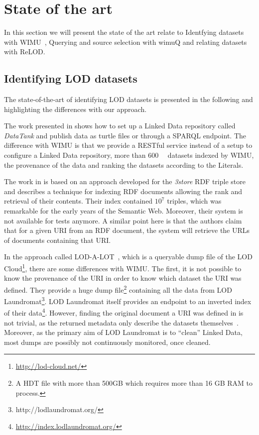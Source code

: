\documentclass[sw]{iosart2x}
\begin{document}
\section{State of the art}
\label{sec:related}

In this section we will present the state of the art relate to Identfying datasets with WIMU~\cite{valdestilhas2018my}, Querying and source selection with wimuQ\cite{valdestilhas2019more} and relating datasets with ReLOD.

\subsection{Identifying LOD datasets}
The state-of-the-art of identifying LOD datasets is presented in the following and highlighting the differences with our approach.

The work presented in \cite{colpaert2014painless} shows how to set up a Linked Data repository called \emph{DataTank} and publish data as turtle files or through a SPARQL endpoint.
The difference with WIMU is that we provide a RESTful service instead of a setup to configure a Linked Data repository{\color{blue}, more than \SI{600}{\kilo\nothing} datasets indexed by WIMU, the provenance of the data and ranking the datasets according to the Literals}.

The work in \cite{harris2004semindex} is based on an approach developed for the \emph{3store} RDF triple store and describes a technique for indexing RDF documents allowing the rank and retrieval of their contents. 
Their index contained $10^7$ triples, which was remarkable for the early years of the Semantic Web.
Moreover, their system is not available for tests anymore.
A similar point here is that the authors claim that for a given URI from an RDF document, the system will retrieve the URLs of documents containing that URI.

In the approach called LOD-A-LOT~\cite{fernandez2017lod}, which is a queryable dump file of the LOD Cloud\footnote{\url{http://lod-cloud.net/}}, there are some differences with WIMU.
The first, it is not possible to know the provenance of the URI in order to know which dataset the URI was defined. 
They provide a huge dump file\footnote{A HDT file with more than 500GB which requires more than 16 GB RAM to process.} containing all the data from LOD Laundromat\footnote{http://lodlaundromat.org/}.
LOD Laundromat itself provides an endpoint to an inverted index of their data\footnote{\url{http://index.lodlaundromat.org/}}.
However, finding the original document a URI was defined in is not trivial, as the returned metadata only describe the datasets themselves~\cite{beek2014lod}.
Moreover, as the primary aim of LOD Laundromat is to \enquote{clean} Linked Data, most dumps are possibly not continuously monitored, once cleaned.
\end{document}

